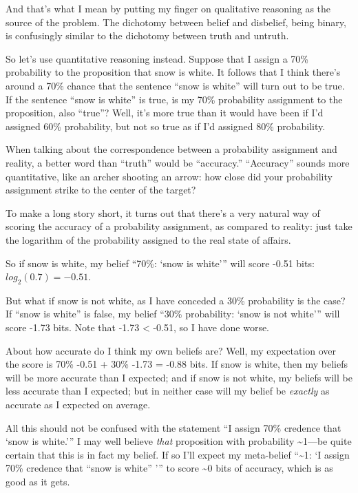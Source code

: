 {
 And that's what I mean by putting my finger on
qualitative reasoning as the source of the problem. The dichotomy
between belief and disbelief, being binary, is confusingly similar to
the dichotomy between truth and untruth.}

{
 So let's use quantitative reasoning instead.
Suppose that I assign a 70\% probability to the proposition that snow
is white. It follows that I think there's around a 70\%
chance that the sentence ``snow is
white'' will turn out to be true. If the sentence
``snow is white'' is true, is my
70\% probability assignment to the proposition, also
``true''? Well, it's
more true than it would have been if I'd assigned 60\%
probability, but not so true as if I'd assigned 80\%
probability.}

{
 When talking about the correspondence between a probability
assignment and reality, a better word than
``truth'' would be
``accuracy.''
``Accuracy'' sounds more
quantitative, like an archer shooting an arrow: how close did your
probability assignment strike to the center of the target?}

{
 To make a long story short, it turns out that
there's a very natural way of scoring the accuracy of a
probability assignment, as compared to reality: just take the logarithm
of the probability assigned to the real state of affairs.}

{
 So if snow is white, my belief ``70\%:
`snow is white''' will
score -0.51 bits: $log_{2}(0.7) = -0.51$.}

{
 But what if snow is not white, as I have conceded a 30\%
probability is the case? If ``snow is
white'' is false, my belief ``30\%
probability: `snow is not
white''' will score -1.73 bits. Note
that -1.73 {\textless} -0.51, so I have done worse.}

{
 About how accurate do I think my own beliefs are? Well, my
expectation over the score is 70\% {\texttimes} -0.51 + 30\%
{\texttimes} -1.73 = -0.88 bits. If snow is white, then my beliefs will
be more accurate than I expected; and if snow is not white, my beliefs
will be less accurate than I expected; but in neither case will my
belief be \textit{exactly} as accurate as I expected on average.}

{
 All this should not be confused with the statement
``I assign 70\% credence that `snow is
white.''' I may well believe
\textit{that} proposition with probability \~{}1---be quite certain
that this is in fact my belief. If so I'll expect my
meta-belief ``\~{}1: `I assign 70\%
credence that ``snow is white''
''' to score \~{}0 bits of accuracy,
which is as good as it gets.}

